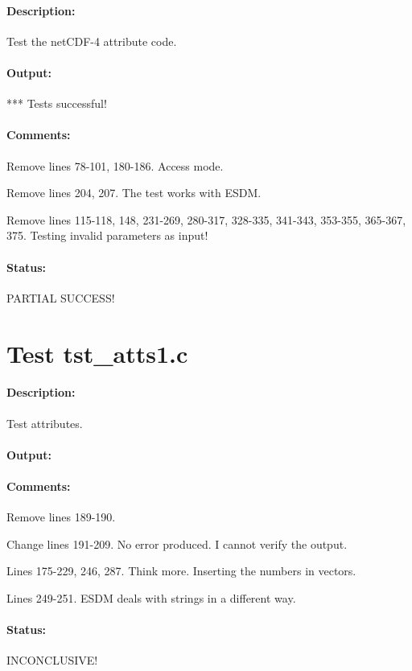 \paragraph{Description:} Test the netCDF-4 attribute code.

\paragraph{Output:} *** Tests successful!

\paragraph{Comments:} Remove lines 78-101, 180-186. Access mode.

Remove lines 204, 207. The test works with ESDM.

Remove lines 115-118, 148, 231-269, 280-317, 328-335, 341-343, 353-355, 365-367, 375. Testing invalid parameters as input!

\paragraph{Status:} PARTIAL SUCCESS!

\section{Test tst\_atts1.c}

\paragraph{Description:} Test attributes.

\paragraph{Output:}

\paragraph{Comments:} Remove lines 189-190.

Change lines 191-209. No error produced. I cannot verify the output.

Lines 175-229, 246, 287. Think more. Inserting the numbers in vectors.

Lines 249-251. ESDM deals with strings in a different way.

\paragraph{Status:} INCONCLUSIVE!

